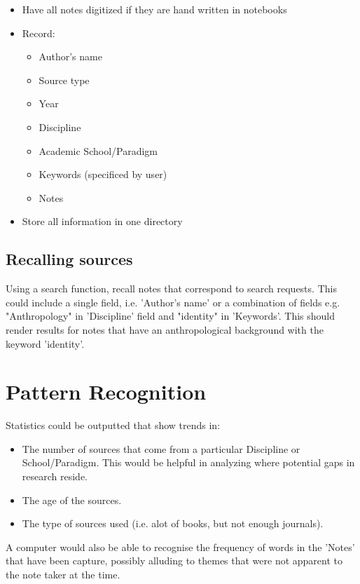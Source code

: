 \documentclass{article}
\begin{document}
\begin{itemize}
    \item Have all notes digitized if they are hand written in notebooks
    \item Record:
        \begin{itemize}
            \item Author's name
            \item Source type
            \item Year
            \item Discipline
            \item Academic School/Paradigm
            \item Keywords (specificed by user)
            \item Notes
        \end{itemize}
    \item Store all information in one directory
\end{itemize}

\subsection{Recalling sources}

Using a search function, recall notes that correspond to search requests. This could include a single field, i.e. 'Author's name' or a combination of fields e.g. "Anthropology" in 'Discipline' field and "identity" in 'Keywords'. This should render results for notes that have an anthropological background with the keyword 'identity'.

\section{Pattern Recognition}

Statistics could be outputted that show trends in:

\begin{itemize}
    \item The number of sources that come from a particular Discipline or School/Paradigm. This would be helpful in analyzing where potential gaps in research reside.
    \item The age of the sources.
    \item The type of sources used (i.e. alot of books, but not enough journals).
\end{itemize}

A computer would also be able to recognise the frequency of words in the 'Notes' that have been capture, possibly alluding to themes that were not apparent to the note taker at the time.
\end{document}
